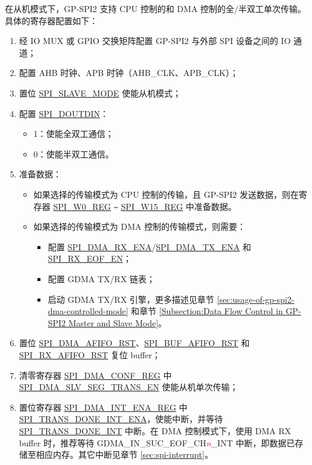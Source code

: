 \documentclass[main\_\_CN.tex]{subfiles}
\begin{document}
在从机模式下，GP-SPI2 支持 CPU 控制的和 DMA 控制的全/半双工单次传输。具体的寄存器配置如下：
\begin{enumerate}
    \item 经 IO MUX 或 GPIO 交换矩阵配置 GP-SPI2 与外部 SPI 设备之间的 IO 通道；

    \item 配置 AHB 时钟、APB 时钟（AHB\_CLK、APB\_CLK）；

    \item 置位 \hyperref[fielddesc:SPISLAVEMODE]{SPI\_SLAVE\_MODE} 使能从机模式；

    \item 配置 \hyperref[fielddesc:SPIDOUTDIN]{SPI\_DOUTDIN}：
    \begin{itemize}
        \item 1：使能全双工通信；
        \item 0：使能半双工通信。
    \end{itemize}

    \item 准备数据：
    \begin{itemize}
        \item 如果选择的传输模式为 CPU 控制的传输，且 GP-SPI2 发送数据，则在寄存器 \hyperref[regdesc:SPIW0REG]{SPI\_W0\_REG} \verb+~+ \hyperref[regdesc:SPIW15REG]{SPI\_W15\_REG} 中准备数据。
        \item 如果选择的传输模式为 DMA 控制的传输模式，则需要：
        \begin{itemize}
            \item 配置 \hyperref[fielddesc:SPIDMARXENA]{SPI\_DMA\_RX\_ENA}/\hyperref[fielddesc:SPIDMATXENA]{SPI\_DMA\_TX\_ENA} 和 \hyperref[fielddesc:SPIRXEOFEN]{SPI\_RX\_EOF\_EN}；
            \item 配置 GDMA TX/RX 链表；
            \item 启动 GDMA TX/RX 引擎，更多描述见章节  \ref{sec:usage-of-gp-spi2-dma-controlled-mode} 和章节  \ref{Subsection:Data Flow Control in GP-SPI2 Master and Slave Mode}。
        \end{itemize}
    \end{itemize}

    \item 置位 \hyperref[fielddesc:SPIDMAAFIFORST]{SPI\_DMA\_AFIFO\_RST}、\hyperref[fielddesc:SPIBUFAFIFORST]{SPI\_BUF\_AFIFO\_RST} 和 \hyperref[fielddesc:SPIRXAFIFORST]{SPI\_RX\_AFIFO\_RST} 复位 buffer；

    \item 清零寄存器 \hyperref[regdesc:SPIDMACONFREG]{SPI\_DMA\_CONF\_REG} 中 \hyperref[fielddesc:SPIDMASLVSEGTRANSEN]{SPI\_DMA\_SLV\_SEG\_TRANS\_EN} 使能从机单次传输；

    \item 置位寄存器 \hyperref[regdesc:SPIDMAINTENAREG]{SPI\_DMA\_INT\_ENA\_REG} 中 \hyperref[fielddesc:SPITRANSDONEINTENA]{SPI\_TRANS\_DONE\_INT\_ENA}，使能中断，并等待 \hyperref[int:SPITRANSDONEINT]{SPI\_TRANS\_DONE\_INT} 中断。在 DMA 控制模式下，使用 DMA RX buffer 时，推荐等待 GDMA\_IN\_SUC\_EOF\_CH\textcolor{red}{\it{n}}\_INT 中断，即数据已存储至相应内存。其它中断见章节 \ref{sec:spi-interrupt}。
\end{enumerate}
\end{document}
